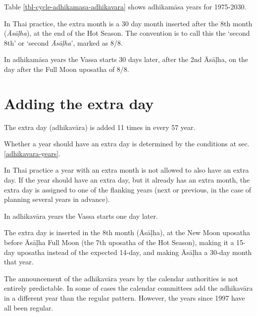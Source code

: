 \documentclass[11pt,oneside]{memoir-article}
\begin{document}
Table \ref{tbl-cycle-adhikamasa-adhikavara} shows adhikamāsa years for 1975-2030.

In Thai practice, the extra month is a 30 day month inserted after the
8th month (\emph{Āsāḷha}), at the end of the Hot Season. The convention is
to call this the `second 8th' or `second \emph{Āsāḷha}', marked as 8/8.


In adhikamāsa years the Vassa starts 30 days later, after the 2nd
Āsāḷha, on the day after the Full Moon uposatha of 8/8.

\section{Adding the extra day}
\label{sec-2-2}
\label{adding-extra-day}

The extra day (adhikavāra) is added 11 times in every 57 year.

Whether a year should have an extra day is determined by the conditions at
sec. \ref{adhikavara-years}.

In Thai practice a year with an extra month is not allowed to also
have an extra day. If the year should have an extra day, but it
already has an extra month, the extra day is assigned to one of the
flanking years (next or previous, in the case of planning several
years in advance).

In adhikavāra years the Vassa starts one day later.

The extra day is inserted in the 8th month (Āsāḷha), at the New Moon uposatha
before Āsāḷha Full Moon (the 7th uposatha of the Hot Season), making it a 15-day
uposatha instead of the expected 14-day, and making Āsāḷha a 30-day month that
year.\cite{hasapannyo-zodiac}

The announcement of the adhikavāra years by the calendar authorities is not
entirely predictable. In some of cases the calendar committees add the
adhikavāra in a different year than the regular pattern. However, the years
since 1997 have all been regular.
\end{document}
